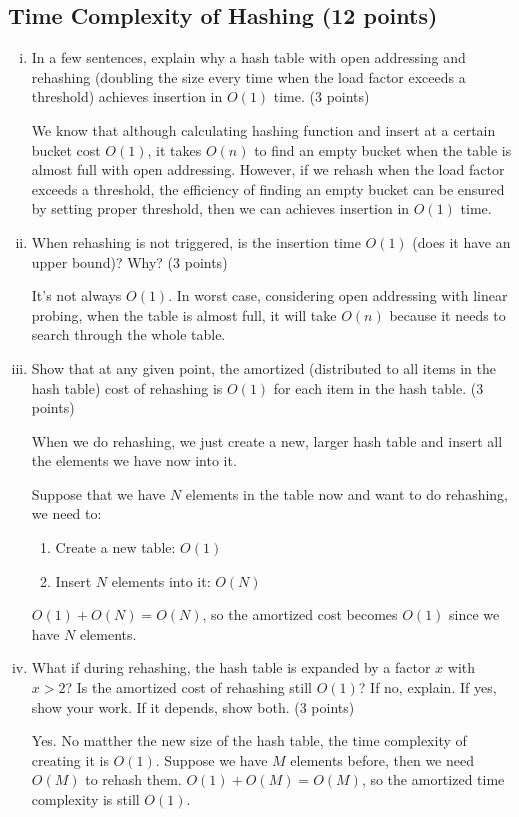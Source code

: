 \documentclass[11pt]{exam}
\begin{document}
\subsection{Time Complexity of Hashing (12 points)}
\begin{enumerate}[i)]
\item In a few sentences, explain why a hash table with open addressing and rehashing (doubling the size every time when the load factor exceeds a threshold) achieves insertion in $O(1)$ time. (3 points)
\begin{solution}
\par
We know that although calculating hashing function and insert at a certain bucket cost $O(1)$, it takes $O(n)$ to find an empty bucket when the table is almost full with open addressing. However, if we rehash when the load factor exceeds a threshold, the efficiency of finding an empty bucket can be ensured by setting proper threshold, then we can achieves insertion in $O(1)$ time.
\end{solution}
\item When rehashing is not triggered, is the insertion time $O(1)$ (does it have an upper bound)? Why? (3 points)
\begin{solution}
\par
It's not always $O(1)$. In worst case, considering open addressing with linear probing, when the table is almost full, it will take $O(n)$ because it needs to search through the whole table.
\end{solution}
\item Show that at any given point, the amortized (distributed to all items in the hash table) cost of rehashing is $O(1)$ for each item in the hash table. (3 points)
\begin{solution}
\par
When we do rehashing, we just create a new, larger hash table and insert all the elements we have now into it.
\par
Suppose that we have $N$ elements in the table now and want to do rehashing, we need to:
\begin{enumerate}
    \item Create a new table: $O(1)$
    \item Insert $N$ elements into it: $O(N)$
\end{enumerate}
$O(1)+O(N)=O(N)$, so the amortized cost becomes $O(1)$ since we have $N$ elements.
\end{solution}
\item What if during rehashing, the hash table is expanded by a factor $x$ with $x > 2$? Is the amortized cost of rehashing still $O(1)$? If no, explain. If yes, show your work. If it depends, show both. (3 points)
\begin{solution}
\par
Yes. No matther the new size of the hash table, the time complexity of creating it is $O(1)$. Suppose we have $M$ elements before, then we need $O(M)$ to rehash them. $O(1)+O(M)=O(M)$, so the amortized time complexity is still $O(1)$.
\end{solution}
\end{enumerate}
\end{document}
